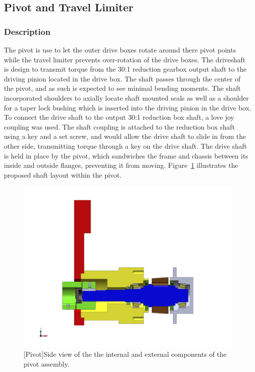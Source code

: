 \subsection{Pivot and Travel Limiter}

\subsubsection{Description}

The pivot is use to let the outer drive boxes rotate around there pivot points while the travel limiter prevents over-rotation of the drive boxes. The driveshaft is design to transmit torque from the 30:1 reduction gearbox output shaft to the driving pinion located in the drive box. The shaft passes through the center of the pivot, and as such is expected to see minimal bending moments. The shaft incorporated shoulders to axially locate shaft mounted seals as well as a shoulder for a taper lock bushing which is inserted into the driving pinion in the drive box. To connect the drive shaft to the output 30:1 reduction box shaft, a love joy coupling was used. The shaft coupling is attached to the reduction box shaft using a key and a set screw, and would allow the drive shaft to slide in from the other side, transmitting torque through a key on the drive shaft. The drive shaft is held in place by the pivot, which sandwiches the frame and chassis between its inside and outside flanges, preventing it from moving. Figure~\ref{fig:pivot_assembly_drw} illustrates the proposed shaft layout within the pivot.

\begin{figure}[htbp]
\centering
\includegraphics[height=0.3\textheight]{./images/pivot_assembly_drw}
[Pivot]{Side view of the the internal and external components of the pivot assembly.}
\label{fig:pivot_assembly_drw}
\end{figure}


